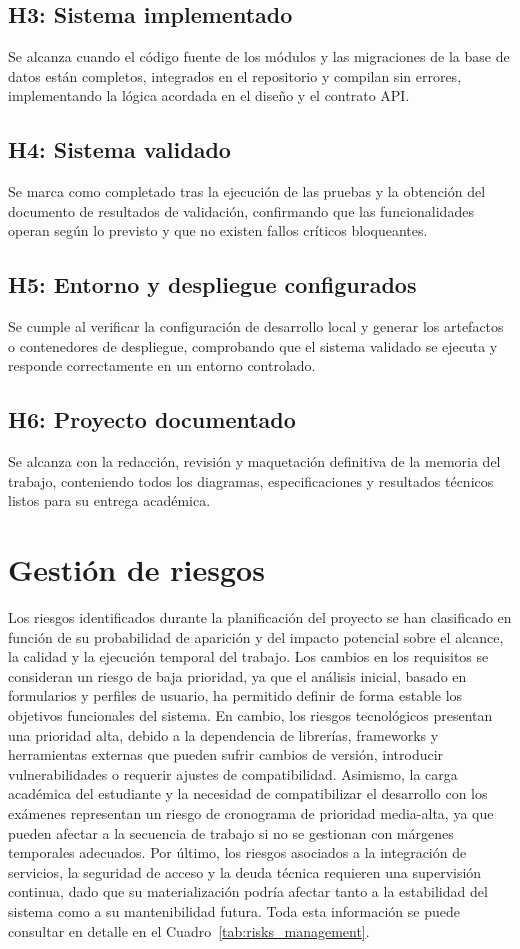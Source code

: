 \subsection*{H3: Sistema implementado}
Se alcanza cuando el código fuente de los módulos y las migraciones de la base de datos están completos, integrados en el repositorio y compilan sin errores, implementando la lógica acordada en el diseño y el contrato API.

\subsection*{H4: Sistema validado}
Se marca como completado tras la ejecución de las pruebas y la obtención del documento de resultados de validación, confirmando que las funcionalidades operan según lo previsto y que no existen fallos críticos bloqueantes.

\subsection*{H5: Entorno y despliegue configurados}
Se cumple al verificar la configuración de desarrollo local y generar los artefactos o contenedores de despliegue, comprobando que el sistema validado se ejecuta y responde correctamente en un entorno controlado.

\subsection*{H6: Proyecto documentado}
Se alcanza con la redacción, revisión y maquetación definitiva de la memoria del trabajo, conteniendo todos los diagramas, especificaciones y resultados técnicos listos para su entrega académica.

\section{Gestión de riesgos}
Los riesgos identificados durante la planificación del proyecto se han clasificado en función de su probabilidad de aparición y del impacto potencial sobre el alcance, la calidad y la ejecución temporal del trabajo. Los cambios en los requisitos se consideran un riesgo de baja prioridad, ya que el análisis inicial, basado en formularios y perfiles de usuario, ha permitido definir de forma estable los objetivos funcionales del sistema. En cambio, los riesgos tecnológicos presentan una prioridad alta, debido a la dependencia de librerías, frameworks y herramientas externas que pueden sufrir cambios de versión, introducir vulnerabilidades o requerir ajustes de compatibilidad. Asimismo, la carga académica del estudiante y la necesidad de compatibilizar el desarrollo con los exámenes representan un riesgo de cronograma de prioridad media-alta, ya que pueden afectar a la secuencia de trabajo si no se gestionan con márgenes temporales adecuados. Por último, los riesgos asociados a la integración de servicios, la seguridad de acceso y la deuda técnica requieren una supervisión continua, dado que su materialización podría afectar tanto a la estabilidad del sistema como a su mantenibilidad futura. Toda esta información se puede consultar en detalle en el Cuadro~\ref{tab:risks_management}.

